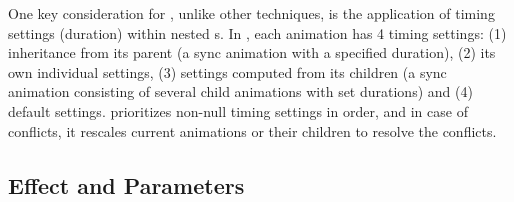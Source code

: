 One key consideration for \gaia{}, unlike other techniques, is the application of timing settings (\ie duration) within nested \aniunit{}s.
In \gaia{}, each animation has 4 timing settings: 
(1) inheritance from its parent (\eg a sync animation with a specified duration), 
(2) its own individual settings, 
(3) settings computed from its children (\eg a sync animation consisting of several child animations with set durations) and 
(4) default settings.
\gaia{} prioritizes non-null timing settings in order, and in case of conflicts, it rescales current animations or their children to resolve the conflicts.


\subsection{Effect and Parameters}
\label{ssec:gaia_ani_effect}


\begin{table}[]
	\caption{Effect attributes}
	\vspace{-3mm}
	\label{tab:effect}
	\vspace{-5mm}
\end{table}


